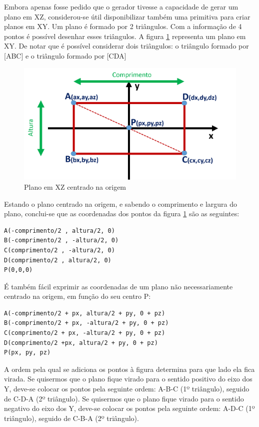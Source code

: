 Embora apenas fosse pedido que o gerador tivesse a capacidade de gerar um plano em XZ, considerou-se útil disponibilizar também uma primitiva para criar planos em XY.
Um plano é formado por 2 triângulos. Com a informação de 4 pontos é possível desenhar esses triângulos. A figura \ref{p1:fig:p3_planoZ} representa um plano em XY. De notar que é possível considerar dois triângulos: o triângulo formado por [ABC] e o triângulo formado por [CDA]

\begin{figure}[<+htpb+>]
	\centering
	\includegraphics[scale=0.5]{imagens/p3_planoZ.png}
	\caption{Plano em XZ centrado na origem}
	\label{p1:fig:p3_planoZ}
\end{figure}

Estando o plano centrado na origem, e sabendo o comprimento e largura do plano, conclui-se que as coordenadas dos pontos da figura \ref{p1:fig:p3_planoZ} são as seguintes:

\begin{Verbatim}
A(-comprimento/2 , altura/2, 0)
B(-comprimento/2 , -altura/2, 0)
C(comprimento/2 , -altura/2, 0)
D(comprimento/2 , altura/2, 0)
P(0,0,0)
\end{Verbatim}

É também fácil exprimir as coordenadas de um plano não necessariamente centrado na origem, em função do seu centro P:

\begin{Verbatim}
A(-comprimento/2 + px, altura/2 + py, 0 + pz)
B(-comprimento/2 + px, -altura/2 + py, 0 + pz)
C(comprimento/2 + px, -altura/2 + py, 0 + pz)
D(comprimento/2 +px, altura/2 + py, 0 + pz)
P(px, py, pz)
\end{Verbatim}

A ordem pela qual se adiciona os pontos à figura determina para que lado ela fica virada. Se quisermos que o plano fique virado para o sentido positivo do eixo dos Y, deve-se colocar os pontos pela seguinte ordem: A-B-C (1º triângulo), seguido de C-D-A (2º triângulo). Se quisermos que o plano fique virado para o sentido negativo do eixo dos Y, deve-se colocar os pontos pela seguinte ordem: A-D-C (1º triângulo), seguido de C-B-A (2º triângulo).

